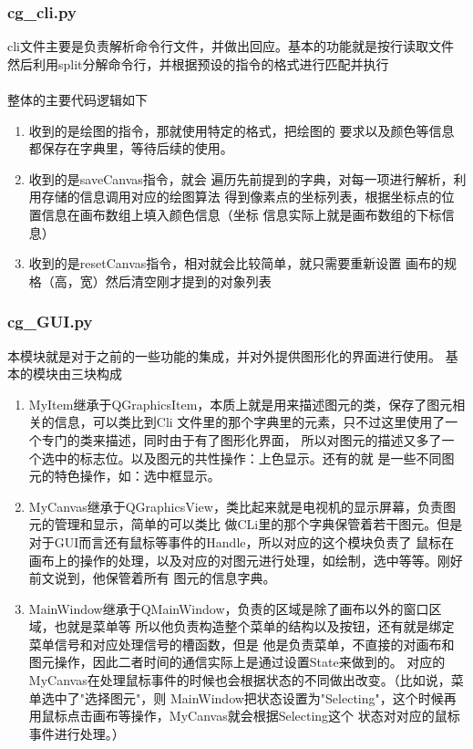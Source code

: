 \documentclass[a4paper,UTF8]{article}
\theoremstyle{definition}
\begin{document}
\subsubsection{cg\_cli.py}
cli文件主要是负责解析命令行文件，并做出回应。基本的功能就是按行读取文件
然后利用split分解命令行，并根据预设的指令的格式进行匹配并执行\\\\
整体的主要代码逻辑如下
\begin{enumerate}
    \item 收到的是绘图的指令，那就使用特定的格式，把绘图的
    要求以及颜色等信息都保存在字典里，等待后续的使用。
    \item 收到的是saveCanvas指令，就会
    遍历先前提到的字典，对每一项进行解析，利用存储的信息调用对应的绘图算法
    得到像素点的坐标列表，根据坐标点的位置信息在画布数组上填入颜色信息（坐标
    信息实际上就是画布数组的下标信息）
    \item 收到的是resetCanvas指令，相对就会比较简单，就只需要重新设置
    画布的规格（高，宽）然后清空刚才提到的对象列表
\end{enumerate}
\subsubsection{cg\_GUI.py}
本模块就是对于之前的一些功能的集成，并对外提供图形化的界面进行使用。
基本的模块由三块构成
\begin{enumerate}
    \item MyItem继承于QGraphicsItem，本质上就是用来描述图元的类，保存了图元相关的信息，可以类比到Cli
    文件里的那个字典里的元素，只不过这里使用了一个专门的类来描述，同时由于有了图形化界面，
    所以对图元的描述又多了一个选中的标志位。以及图元的共性操作：上色显示。还有的就
    是一些不同图元的特色操作，如：选中框显示。
    \item MyCanvas继承于QGraphicsView，类比起来就是电视机的显示屏幕，负责图元的管理和显示，简单的可以类比
    做CLi里的那个字典保管着若干图元。但是对于GUI而言还有鼠标等事件的Handle，所以对应的这个模块负责了
    鼠标在画布上的操作的处理，以及对应的对图元进行处理，如绘制，选中等等。刚好前文说到，他保管着所有
    图元的信息字典。
    \item MainWindow继承于QMainWindow，负责的区域是除了画布以外的窗口区域，也就是菜单等
    所以他负责构造整个菜单的结构以及按钮，还有就是绑定菜单信号和对应处理信号的槽函数，但是
    他是负责菜单，不直接的对画布和图元操作，因此二者时间的通信实际上是通过设置State来做到的。
    对应的MyCanvas在处理鼠标事件的时候也会根据状态的不同做出改变。（比如说，菜单选中了"选择图元"，则
    MainWindow把状态设置为"Selecting"，这个时候再用鼠标点击画布等操作，MyCanvas就会根据Selecting这个
    状态对对应的鼠标事件进行处理。）
\end{enumerate}
\end{document}
